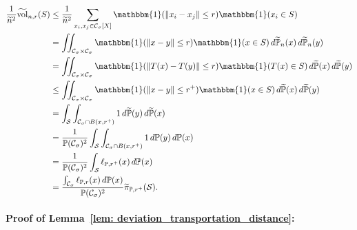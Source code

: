 \documentclass[11pt,twoside]{article}
\theoremstyle{definition}
\newcommand{\vol}{\mathrm{vol}}
\newcommand{\norm}[1]{\left\lVert#1\right\rVert}
\newcommand{\1}{\mathbbm{1}}
\newcommand{\Xbf}{X}
\newcommand{\Pbb}{\mathbb{P}}
\newcommand{\Sset}{\mathcal{S}}
\newcommand{\Cset}{\mathcal{C}}
\newcommand{\Csig}{\Cset_{\sigma}}
\newcommand{\piwt}{\widetilde{\pi}}
\begin{document}
\begin{align}
\frac{1}{\widetilde{n}^2} \widetilde{\vol}_{n,r}(S) & \leq \frac{1}{ \widetilde{n}^2} \sum_{x_i, x_j \in \Csig[\Xbf]} \1(\norm{x_i - x_j} \leq r) \1(x_i \in S) \nonumber \\
& = \iint_{\Csig \times \Csig} \1(\norm{x - y} \leq r) \1(x \in S) \,d\widetilde{\Pbb}_n(x) \,d\widetilde{\Pbb}_n(y) \nonumber \\
& = \iint_{\Csig \times \Csig} \1(\norm{T(x) - T(y)} \leq r) \1(T(x) \in S) \,d\widetilde{\Pbb}(x) \,d\widetilde{\Pbb}(y) \nonumber \\
& \leq \iint_{\Csig \times \Csig} \1(\norm{x - y} \leq r^+) \1(x \in S) \,d\widetilde{\Pbb}(x) \,d\widetilde{\Pbb}(y) \nonumber \\
& = \int_{\Sset} \int_{\Csig \cap B(x,r^+)} 1 \,d\widetilde{\Pbb}(y) \,d\widetilde{\Pbb}(x) \nonumber \\
& = \frac{1}{\Pbb(\Csig)^2}\int_{\Sset} \int_{\Csig \cap B(x,r^+)} 1 \,d\Pbb(y) \,d\Pbb(x) \nonumber \\
& = \frac{1}{\Pbb(\Csig)^2}\int_{\Sset} \ell_{\Pbb,r^+}(x) \,d\Pbb(x) \nonumber \\
& = \frac{\int_{\Csig} \ell_{\Pbb,r}(x) \,d\Pbb(x)}{\Pbb(\Csig)^2} \piwt_{\Pbb,r^+}(\Sset). \label{eqn: vol_bound}
\end{align}

\paragraph{Proof of Lemma~\ref{lem: deviation_transportation_distance}: }
\end{document}
